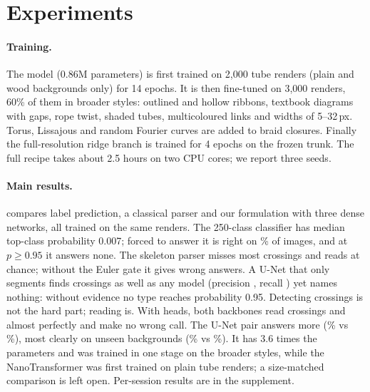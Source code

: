 \section{Experiments}\label{sec:exp}

\paragraph{Training.} The model (0.86M parameters) is first trained on 2{,}000 tube renders
(plain and wood backgrounds only) for 14 epochs. It is then fine-tuned on 3{,}000
renders, 60\% of them in broader styles: outlined and hollow ribbons, textbook
diagrams with gaps, rope twist, shaded tubes, multicoloured links and widths of
5--32\,px. Torus, Lissajous and random Fourier curves are added to braid closures.
Finally the full-resolution ridge branch is trained for 4 epochs on the frozen
trunk. The full recipe takes about 2.5 hours on two CPU cores; we report three seeds.

\begin{table}[t]
\centering\small
\setlength{\tabcolsep}{\widetabcolsep}
\caption{\textbf{Main results on \bench{}} (\VthreeImages{} photo-like images of
\VthreeCables{} cables; unseen = backgrounds S3/S4). Crossing precision (P) and recall (R),
\ou{} (O/U) accuracy on matched crossings, fraction of images answered, and wrong
answers. Our full model recovers \VthreeRecall{} of crossings and answers
\VthreeCov\% of images with \VthreeWrong{} wrong answers.}
\label{tab:main}
\end{table}

\paragraph{Main results.}  compares label prediction, a classical parser and
our formulation with three dense networks, all trained on the same renders. The 250-class
classifier has median top-class probability 0.007; forced to answer it is right on
\ClfBenchAcc\% of images, and at $p\ge0.95$ it answers none. The skeleton parser misses
most crossings and reads \ou{} at chance; without the Euler gate it gives
\BaseWrongNoGate{} wrong answers. A U-Net that only segments finds crossings as well as any
model (precision \USegPrec, recall \USegRecall) yet names nothing: without \ou{} evidence no
type reaches probability 0.95. Detecting crossings is not the hard part; reading \ou{} is.
With \ou{} heads, both backbones read crossings and \ou{} almost perfectly and make no wrong
call. The U-Net pair answers more (\UPCov\% vs \VthreeCov\%), most clearly on unseen
backgrounds (\UPUnseenCov\% vs \VthreeUnseenCov\%). It has 3.6 times the parameters and was
trained in one stage on the broader styles, while the NanoTransformer was first trained on
plain tube renders; a size-matched comparison is left open. Per-session results are in the
supplement.


